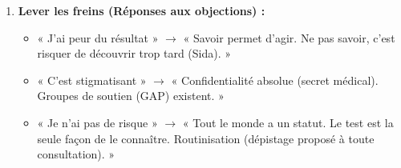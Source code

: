 \documentclass[11pt]{article}
\begin{document}
\begin{methode}
\begin{enumerate}
\begin{itemize}
    \end{itemize}
    \item \textbf{Lever les freins (Réponses aux objections) :}
    \begin{itemize}
        \item « J'ai peur du résultat » $\rightarrow$ « Savoir permet d'agir. Ne pas savoir, c'est risquer de découvrir trop tard (Sida). »
        \item « C'est stigmatisant » $\rightarrow$ « Confidentialité absolue (secret médical). Groupes de soutien (GAP) existent. »
        \item « Je n'ai pas de risque » $\rightarrow$ « Tout le monde a un statut. Le test est la seule façon de le connaître. Routinisation (dépistage proposé à toute consultation). »
    \end{itemize}
\end{enumerate}
\end{methode}
\end{document}
